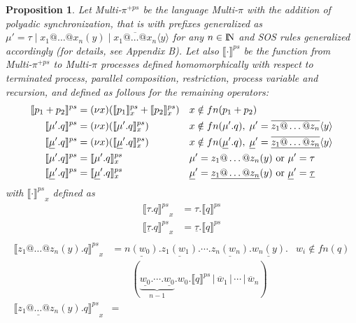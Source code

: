 \documentclass[submission,copyright,creativecommons]{eptcs}
\newcommand{\nat}{{\rm I\!N}}
\newcommand{\restr}[1]{\mbox{$({\bf\nu} #1)$}}
\newcommand{\para}{\mbox{$\,|\,$}}
\newcommand{\encoding}[2]{\ensuremath{\llbracket #2 \rrbracket^{#1}}}
\newtheorem{aproposition}[adefinition]{Proposition}
\newenvironment{proposition}{\begin{aproposition}}{\end{aproposition}}
\begin{document}
\begin{proposition} Let Multi-$\pi^{+ps}$ be the language Multi-$\pi$ with the addition
of polyadic synchronization, that is with prefixes generalized as  $ \mu' = \tau \;|\; x_1@\ldots@x_n(y) \;|\; \overline {x_1@\ldots@x_n} \langle y \rangle $ for any $n \in \nat$ and SOS rules generalized accordingly (for details, see Appendix B). Let also $\encoding {ps} { \cdot }$ be the function from Multi-$\pi^{+ps}$ to Multi-$\pi$ processes
defined homomorphically with respect to terminated process, parallel composition, restriction, process variable and recursion, and defined as follows for the remaining operators:
\begin{align*}
\encoding {ps} { p_1 + p_2 }  &= \restr x ( \encoding {ps} {p_1} _x + \encoding {ps} {p_2} _x ) & & x \notin fn(p_1 + p_2) \\
\encoding {ps} { \mu'.q }  &= \restr x ( \encoding {ps} {\mu'.q} _x ) & & x \notin fn(\mu'.q) , \; \mu' = \overline {z_1@\ldots@z_n} \langle y \rangle \\
\encoding {ps} { \underline{\mu}'.q }  &= \restr x ( \encoding {ps} {\underline{\mu}'.q} _x ) & & x \notin fn(\underline{\mu}'.q) , \; \underline{\mu}' = \underline {\overline {z_1@\ldots@z_n}} \langle y \rangle \\
\encoding {ps} { \mu'.q }  &=  \encoding {ps} {\mu'.q} _{x} & & \mu' =  z_1@\ldots@z_n(y)  \text{ or } \mu' = \tau \\
\encoding {ps} { \underline{\mu}'.q }  &=  \encoding {ps} {\underline{\mu}'.q} _{x} & & \underline{\mu}' =  \underline {z_1@\ldots@z_n}(y)  \text{ or } \underline{\mu}' = \underline \tau
\end{align*}
with $\encoding {ps} { \cdot }_{x}$ defined as
\begin{align*}
\encoding {ps} { \tau.q }_x  &= \tau.\encoding {ps} q  \\
\encoding {ps} { \underline \tau.q }_x  &= \underline \tau.\encoding {ps} q  \\
\end{align*}
\begin{align*}
\encoding {ps} { z_1@\ldots@z_n(y).q }_x  &= 
\underline{n(w_0)}.\underline{z_1(w_1)}. \cdots . \underline{z_n(w_n)}.\underline{w_n(y)}. & w_i \notin fn(q) \\
   & \qquad (\underbrace{\underline{w_0}. \cdots . \underline{w_0}}_{n - 1}.w_0.\encoding {ps} q \para \overline w_1 \para \cdots \para \overline w_n )  \\
\encoding {ps} { \underline {z_1@\ldots@z_n}(y).q }_x  &= 

\end{align*}
\end{proposition}
\end{document}
